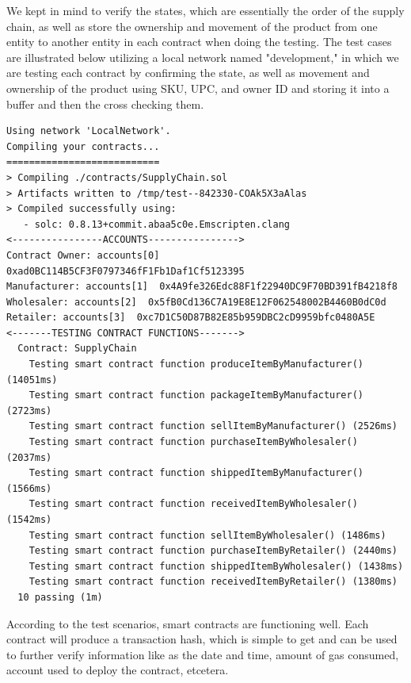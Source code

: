 \vspace{.5cm}

        We kept in mind to verify the states, which are essentially the order of the supply chain, as well as store the ownership and movement of the product from one entity to another entity in each contract when doing the testing. The test cases are illustrated below utilizing a local network named "development," in which we are testing each contract by confirming the state, as well as movement and ownership of the product using \ac{SKU}, \ac{UPC}, and owner ID and storing it into a buffer and then the cross checking them.

\vspace{.5cm}

\begin{lstlisting}[numbers=none, basicstyle=\ttfamily\tiny]
Using network 'LocalNetwork'.
Compiling your contracts...
===========================
> Compiling ./contracts/SupplyChain.sol
> Artifacts written to /tmp/test--842330-COAk5X3aAlas
> Compiled successfully using:
   - solc: 0.8.13+commit.abaa5c0e.Emscripten.clang
<----------------ACCOUNTS---------------->
Contract Owner: accounts[0]  0xad0BC114B5CF3F0797346fF1Fb1Daf1Cf5123395
Manufacturer: accounts[1]  0x4A9fe326Edc88F1f22940DC9F70BD391fB4218f8
Wholesaler: accounts[2]  0x5fB0Cd136C7A19E8E12F062548002B4460B0dC0d
Retailer: accounts[3]  0xc7D1C50D87B82E85b959DBC2cD9959bfc0480A5E
<-------TESTING CONTRACT FUNCTIONS------->
  Contract: SupplyChain
    Testing smart contract function produceItemByManufacturer() (14051ms)
    Testing smart contract function packageItemByManufacturer() (2723ms)
    Testing smart contract function sellItemByManufacturer() (2526ms)
    Testing smart contract function purchaseItemByWholesaler() (2037ms)
    Testing smart contract function shippedItemByManufacturer() (1566ms)
    Testing smart contract function receivedItemByWholesaler() (1542ms)
    Testing smart contract function sellItemByWholesaler() (1486ms)
    Testing smart contract function purchaseItemByRetailer() (2440ms)
    Testing smart contract function shippedItemByWholesaler() (1438ms)
    Testing smart contract function receivedItemByRetailer() (1380ms)
  10 passing (1m)
\end{lstlisting}

\vspace{.5cm}

According to the test scenarios, smart contracts are functioning well. Each contract will produce a transaction hash, which is simple to get and can be used to further verify information like as the date and time, amount of gas consumed, account used to deploy the contract, etcetera.

